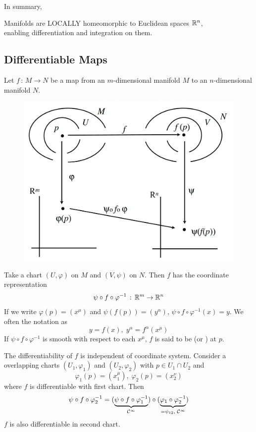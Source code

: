 \documentclass[a4paper, 10pt]{article}
\begin{document}
In summary,
\begin{center}
    Manifolds are LOCALLY homeomorphic to Euclidean spaces $\mathbb{R}^{n}$,\\
    enabling differentiation and integration on them.
\end{center}
\newpage


\subsection{Differentiable Maps}

\begin{definition}
    Let $f \,:\, M \rightarrow N$ be a map from an $m$-dimensional manifold $M$ to an $n$-dimensional manifold $N$.
    
    \begin{figure}[htbp]
        \centering
        \includegraphics[width=0.4\linewidth]{../images/lecture05/5_04.png}
    \end{figure}
    
    Take a chart $(U,\varphi)$ on $M$ and $(V,\psi)$ on $N$. Then $f$ has the coordinate representation
    \[ \psi \circ f \circ \varphi^{-1} \,:\, \mathbb{R}^{m} \rightarrow \mathbb{R}^{n} \]
    If we write $\varphi(p) = (x^{\mu})$ and $\psi(f(p)) = (y^{\alpha})$, $\psi\circ f\circ\varphi^{-1}(x) = y$. We often  the notation as
    \[ y = f(x),\; y^{\alpha} = f^{\alpha}(x^{\mu}) \]
    If $\psi\circ f\circ\varphi^{-1}$ is smooth with respect to each $x^{\mu}$, $f$ is said to be (or ) at $p$.
\end{definition}

\begin{remark}
    The differentiability of $f$ is independent of coordinate system. Consider a overlapping charts $(U_{1},\varphi_{1})$ and $(U_{2},\varphi_{2})$ with $p \in U_{1} \cap U_{2}$ and
    \[ \varphi_{1}(p) = (x_{1}^{\mu}),\; \varphi_{2}(p) = (x_{2}^{\nu}) \]
    where $f$ is differentiable with first chart. Then
    \[ \psi\circ f\circ \varphi_{2}^{-1} = (\underbrace{\psi\circ f\circ\varphi_{1}^{-1}}_{\mathcal{C}^{\infty}})\circ(\underbrace{\varphi_{1}\circ\varphi_{2}^{-1}}_{=\psi_{12},\;\mathcal{C}^{\infty}}) \]
    $f$ is also differentiable in second chart.
\end{remark}
\end{document}
